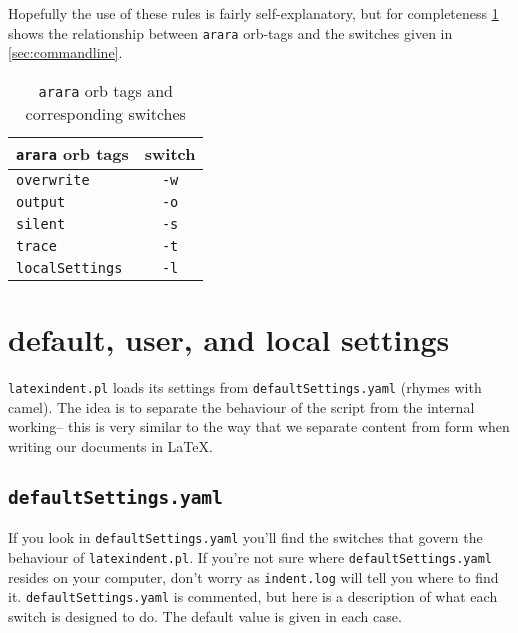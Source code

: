 Hopefully the use of these rules is fairly self-explanatory, but for completeness
\cref{tab:orbsandswitches} shows the relationship between \lstinline!arara! orb-tags and the 
switches given in \cref{sec:commandline}.
 	 	 	 	 	
\begin{table}[!ht]
	\centering
	\caption{\lstinline!arara! orb tags and corresponding switches}
	\label{tab:orbsandswitches}
	\begin{tabular}{lc}
		\toprule
		\lstinline!arara! orb tags & switch         \\
		\midrule
		\lstinline!overwrite!      & \lstinline!-w! \\
		\lstinline!output!         & \lstinline!-o! \\
		\lstinline!silent!         & \lstinline!-s! \\
		\lstinline!trace!          & \lstinline!-t! \\
		\lstinline!localSettings!  & \lstinline!-l! \\
		\bottomrule
	\end{tabular}
\end{table}
\section{default, user, and local settings}\label{sec:defuseloc}
\lstinline!latexindent.pl! loads its settings from \lstinline!defaultSettings.yaml! 
(rhymes with camel). The idea is to separate the behaviour of the script 
from the internal working-- this is very similar to the way that we separate content
from form when writing our documents in \LaTeX.
     
     
\subsection{\lstinline!defaultSettings.yaml!}
If you look in \lstinline!defaultSettings.yaml! you'll find the switches 
that govern the behaviour of \lstinline!latexindent.pl!. If you're not sure where
\lstinline!defaultSettings.yaml! resides on your computer, don't worry as \lstinline!indent.log!
will tell you where to find it.
\lstinline!defaultSettings.yaml! is commented, 
but here is a description of what each switch is designed to do. The default 
value is given in each case.
 	 	 	 	 	
